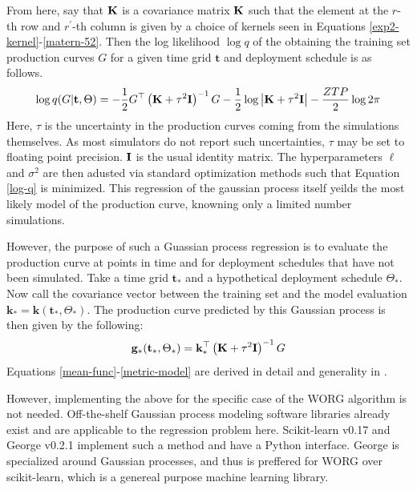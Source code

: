 From here, say that $\mathbf{K}$ is a covariance matrix $\mathbf{K}$ 
such that the element at the $r$-th row and $r^\prime$-th column is 
given by a choice of kernels seen in 
Equations \ref{exp2-kernel}-\ref{matern-52}. Then the 
log likelihood $\log q$ of the obtaining the training set production curves 
$G$ for a given time grid $\mathbf{t}$ and deployment schedule is as follows.
\begin{equation}
\label{log-q}
\log q(G|\mathbf{t}, \Theta) 
    = -\frac{1}{2}G^\top\left(\mathbf{K} + \tau^2\mathbf{I}\right)^{-1}G
      -\frac{1}{2}\log\left|\mathbf{K} + \tau^2\mathbf{I}\right|
      -\frac{ZTP}{2}\log 2\pi
\end{equation}
Here, $\tau$ is the uncertainty in the production curves coming from the 
simulations themselves. As most simulators do not report such uncertainties, 
$\tau$ may be set to floating point precision. $\mathbf{I}$ is the usual identity 
matrix. The hyperparameters $\ell$ and $\sigma^2$ are then adusted via 
standard optimization methods such that Equation \ref{log-q} is minimized. 
This regression of the gaussian process itself yeilds the most likely 
model of the production curve, knowning only a limited number simulations.

However, the purpose of such a Guassian process regression is to evaluate 
the production curve at points in time and for deployment schedules that 
have not been simulated. Take a time grid $\mathbf{t_*}$ and a hypothetical
deployment schedule $\Theta_*$. Now call the covariance vector between
the training set and the model evaluation    
$\mathbf{k}_* = \mathbf{k}(\mathbf{t_*}, \Theta_*)$. 
The production curve predicted by this Gaussian process is then given by
the following:
\begin{equation}
\label{metric-model}
\mathbf{g}_*(\mathbf{t}_*, \Theta_*) = 
    \mathbf{k}_*^\top \left(\mathbf{K} + \tau^2\mathbf{I}\right)^{-1}G
\end{equation}
Equations \ref{mean-func}-\ref{metric-model} are derived in detail and
generality in \cite{rasmussen2006gaussian}. 

However, implementing the above for the specific case of the WORG algorithm 
is not needed.  Off-the-shelf Gaussian process modeling software 
libraries already exist and are applicable to the regression problem here.
Scikit-learn v0.17 \cite{scikit-learn} and George v0.2.1 \cite{hodlr} 
implement such a method and have a Python interface. George is specialized 
around Gaussian processes, and thus is preffered for WORG over scikit-learn, 
which is a genereal purpose machine learning library.

